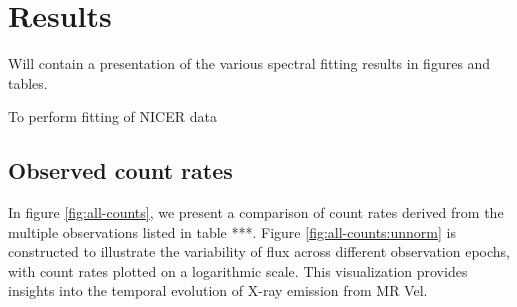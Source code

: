 \section{Results}
    Will contain a presentation of the various spectral fitting results in figures and tables.

    To perform fitting of NICER data \cite{orio2022nicer}

    \subsection{Observed count rates}
    In figure \ref{fig:all-counts}, we present a comparison of count rates derived from the multiple observations listed in table ***. Figure \ref{fig:all-counts:unnorm} is constructed to illustrate the variability of flux across different observation epochs, with count rates plotted on a logarithmic scale. This visualization provides insights into the temporal evolution of X-ray emission from MR Vel.

